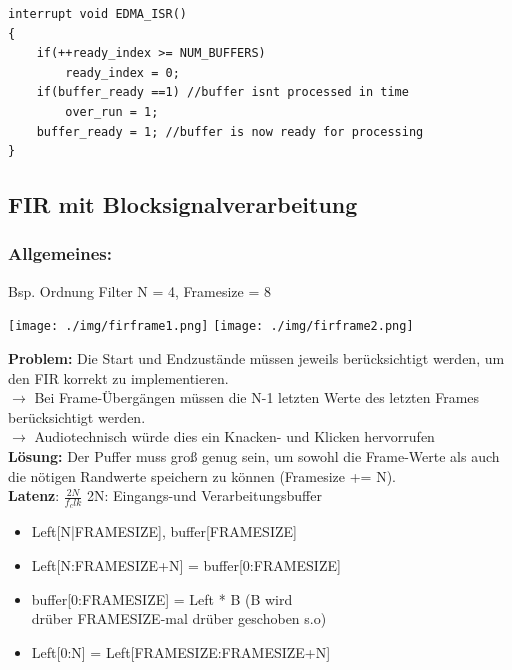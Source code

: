 \documentclass[10pt,a4paper]{article}
\begin{document}
\begin{verbatim}
interrupt void EDMA_ISR()
{
    if(++ready_index >= NUM_BUFFERS)
        ready_index = 0;
    if(buffer_ready ==1) //buffer isnt processed in time
        over_run = 1;
    buffer_ready = 1; //buffer is now ready for processing
}
\end{verbatim}

\subsection{FIR mit Blocksignalverarbeitung}
\subsubsection{Allgemeines:}
Bsp. Ordnung Filter N = 4, Framesize = 8\\
  \begin{center}
      \texttt{[image: ./img/firframe1.png]}
      \texttt{[image: ./img/firframe2.png]}
  \end{center}
\textbf{Problem:} Die Start und Endzustände müssen jeweils berücksichtigt werden, um den FIR korrekt zu implementieren.\\ 
$\rightarrow$ Bei Frame-Übergängen müssen die N-1 letzten Werte des letzten Frames berücksichtigt werden.\\
$\rightarrow$ Audiotechnisch würde dies ein \grqq{}Knacken-\grqq{} und \grqq{}Klicken\grqq{} hervorrufen\\
\textbf{Lösung:} Der Puffer muss groß genug sein, um sowohl die Frame-Werte als auch die nötigen Randwerte speichern zu können (Framesize += N).
\\
\textbf{Latenz}: $\frac{2N}{f_clk}$ 2N: Eingangs-und Verarbeitungsbuffer

\begin{itemize}
    \item Left[N|FRAMESIZE], buffer[FRAMESIZE]
    \item Left[N:FRAMESIZE+N] = buffer[0:FRAMESIZE]
    \item buffer[0:FRAMESIZE] = Left * B (B wird \\drüber FRAMESIZE-mal drüber geschoben s.o)
    \item Left[0:N] = Left[FRAMESIZE:FRAMESIZE+N]
\end{itemize}
\end{document}
